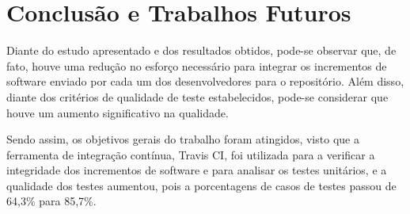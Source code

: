 \chapter[Conclusão e Trabalhos Furutos]{Conclusão e Trabalhos Futuros}

Diante do estudo apresentado e dos resultados obtidos, pode-se observar que, de fato, houve uma redução no esforço necessário para integrar os incrementos de software enviado por cada um dos desenvolvedores para o repositório. Além disso, diante dos critérios de qualidade de teste estabelecidos, pode-se considerar que houve um aumento significativo na qualidade.

Sendo assim, os objetivos gerais do trabalho foram atingidos, visto que a ferramenta de integração contínua, Travis CI, foi utilizada para a verificar a integridade dos incrementos de software e para analisar os testes unitários, e a qualidade dos testes aumentou, pois a porcentagens de casos de testes passou de 64,3\% para 85,7\%.
